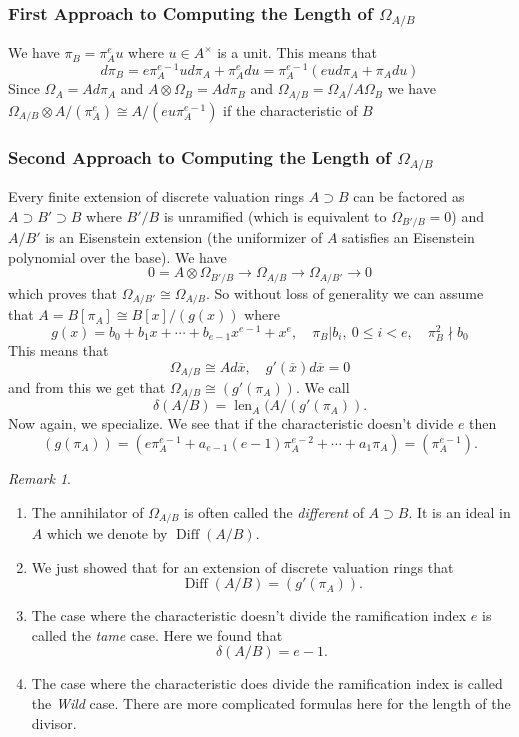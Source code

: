 \documentclass[12pt]{article}
\numberwithin{equation}{section}
\theoremstyle{definition}
\theoremstyle{remark}
\newtheorem{remark}[theorem]{Remark}
\newcommand{\len}{\operatorname{len}}
\begin{document}
\subsubsection{First Approach to Computing the Length of $\Omega_{A/B}$}
We have $\pi_B=\pi_A^e u$ where $u\in A^{\times}$ is a unit. This means that 
 $$ d\pi_B = e\pi_A^{e-1} u d\pi_A + \pi_A^e du = \pi_A^{e-1}( eud\pi_A + \pi_A du) $$
Since $\Omega_A = A d\pi_A$ and $A \otimes \Omega_B = A d\pi_B$ and $\Omega_{A/B} = \Omega_A/A \Omega_B$ we have $\Omega_{A/B} \otimes A/(\pi_A^e) \cong A/(eu\pi_A^{e-1})$ if the characteristic of $B$ 
\subsubsection{Second Approach to Computing the Length of $\Omega_{A/B}$}
Every finite extension of discrete valuation rings $A\supset B$ can be factored as $A \supset B' \supset B$ where $B'/B$ is unramified (which is equivalent to $\Omega_{B'/B}=0$) and $A/B'$ is an Eisenstein extension (the uniformizer of $A$ satisfies an Eisenstein polynomial over the base).
We have 
$$0=A\otimes\Omega_{B'/B} \to \Omega_{A/B} \to \Omega_{A/B'} \to 0$$ 
which proves that $\Omega_{A/B'} \cong \Omega_{A/B}$. 
So without loss of generality we can assume that $A = B[\pi_A]\cong B[x]/(g(x))$ where 
 $$ g(x) = b_0 + b_1x + \cdots + b_{e-1}x^{e-1}+ x^e, \quad \pi_B \vert b_i, \ 0 \leq i <e, \quad \pi_B^2 \nmid b_0 $$
This means that 
 $$ \Omega_{A/B} \cong A d\overline{x}, \quad g'(\overline{x}) d\overline{x} =0 $$
and from this we get that $\Omega_{A/B} \cong (g'(\pi_A))$. 
We call
 $$ \delta(A/B) = \len_A( A/(g'(\pi_A)).$$
Now again, we specialize. 
We see that if the characteristic doesn't divide $e$ then 
 $$ (g(\pi_A)) = (e\pi_A^{e-1} + a_{e-1}(e-1) \pi_A^{e-2} + \cdots + a_1 \pi_A) = (\pi_A^{e-1}). $$

\begin{remark}
	\begin{enumerate}
		\item 	The annihilator of $\Omega_{A/B}$ is often called the \emph{different} of $A\supset B$. 
		It is an ideal in $A$ which we denote by $\operatorname{Diff}(A/B)$.
		\item  We just showed that for an extension of discrete valuation rings that 
		$$ \operatorname{Diff}(A/B) = (g'(\pi_A)). $$
		\item The case where the characteristic doesn't divide the ramification index $e$ is called the \emph{tame} case. 
		Here we found that 
		 $$ \delta(A/B) = e -1.$$
		\item The case where the characteristic does divide the ramification index is called the \emph{Wild} case. 
		There are more complicated formulas here for the length of the divisor. 
	\end{enumerate}
\end{remark}
\end{document}

